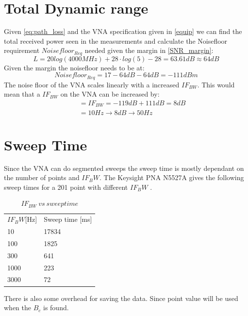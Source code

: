 \section{Total Dynamic range}
Given \autoref{eq:path_loss} and the VNA specification given in \autoref{equip} we can find the total received power seen in the measurements and calculate the Noisefloor requirement $Noisefloor_{Req}$ needed given the margin in \autoref{SNR_margin}:
\begin{equation}
L = 20log (4000MHz) + 28 \cdot log(5)-28 = 63.61dB \approx 64dB
\end{equation}
Given the margin the noisefloor needs to be at:
\begin{equation}
Noisefloor_{Req} = 17 -64dB -64dB = -111dBm 
\end{equation}
The noise floor of the \gls{VNA} scales linearly with a increased $IF_{BW}$\citep{PNA_scale}. This would mean that a $IF_{BW}$ on the \gls{VNA} can be increased by:
\begin{equation}
\begin{split}
&= IF_{BW} = -119dB+111dB = 8dB \\
          \quad &= 10Hz \rightarrow 8dB \rightarrow 50Hz
\end{split}
\end{equation}
\section{Sweep Time}
Since the \gls{VNA} can do segmented sweeps the sweep time is mostly dependant on the number of points and $IF_BW$.
The Keysight PNA N5527A gives the following sweep times for a 201 point with different $IF_BW$ \citep{Key_PNA}.

\begin{table}[H]
\centering
\caption{$IF_{BW} \ vs \ sweep time$}
\label{my-label}
\begin{tabular}{l|l}
\hline
$IF_BW${[}Hz{]} & Sweep time {[}ms{]} \\
10              & 17834               \\
100             & 1825                \\
300             & 641                 \\
1000            & 223                 \\
3000            & 72                 
\end{tabular}
\end{table}

There is also some overhead for saving the data. Since point value will be used when the $B_c$ is found.
